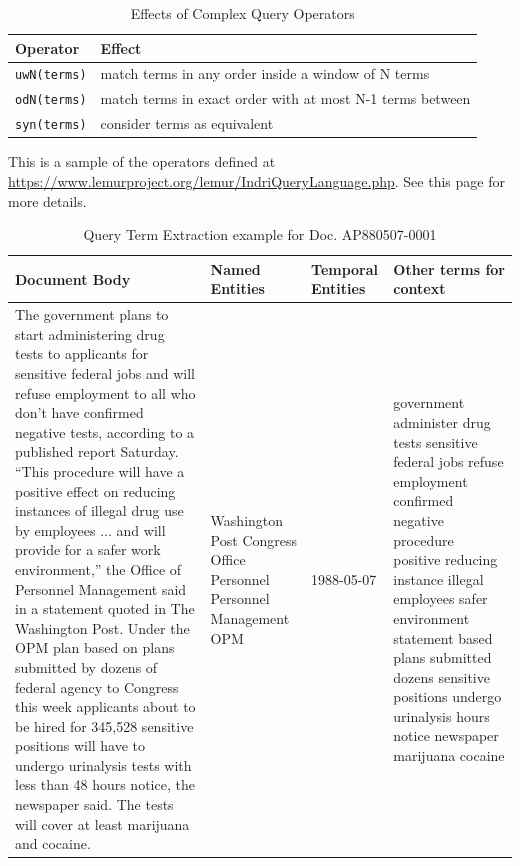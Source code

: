 \documentclass{mprop}
\newcommand{\code}[1]{\texttt{#1}}
\begin{document}
\begin{table}[H]
\centering
\begin{tabular}{|l|l|}
\hline
Operator & Effect \\ \hline
\code{uwN(terms)} & match terms in any order inside a window of N terms \\ \hline
\code{odN(terms)} & match terms in exact order with at most N-1 terms between \\ \hline
\code{syn(terms)} & consider terms as equivalent \\ \hline
\end{tabular}
\caption[Caption for LOF]{Effects of Complex Query Operators}
\small This is a sample of the operators defined at \url{https://www.lemurproject.org/lemur/IndriQueryLanguage.php}. See this page for more details.
\label{complexqueryoperators}
\end{table}
\begin{table}[H]
\centering
\begin{tabular}{|p{6cm}|p{4cm}|p{2cm}|p{3.5cm}|}
\hline
Document Body         & Named Entities  & Temporal Entities & Other terms for \mbox{context}                \\ \hline
\small{The government plans to start administering
drug tests to applicants for sensitive federal jobs and will refuse
employment to all who don't have confirmed negative tests,
according to a published report Saturday.
   ``This procedure will have a positive effect on reducing
instances of illegal drug use by employees ... and will provide for
a safer work environment,'' the Office of Personnel Management said
in a statement quoted in The Washington Post.
   Under the OPM plan based on plans submitted by dozens of
federal agency to Congress this week applicants about to be hired
for 345,528 sensitive positions will have to undergo urinalysis
tests with less than 48 hours notice, the newspaper said. The tests
will cover at least marijuana and cocaine.}		   
& Washington Post \newline
Congress \newline
Office Personnel \newline
Personnel Management \newline
OPM  
& 1988-05-07        
& government
administer drug tests sensitive federal jobs refuse employment confirmed negative procedure positive reducing instance illegal employees safer environment statement based plans submitted dozens sensitive positions undergo urinalysis hours notice newspaper marijuana cocaine \\ \hline
\end{tabular}
\caption{Query Term Extraction example for Doc. AP880507-0001}
\label{queryterms}
\end{table}
\end{document}
